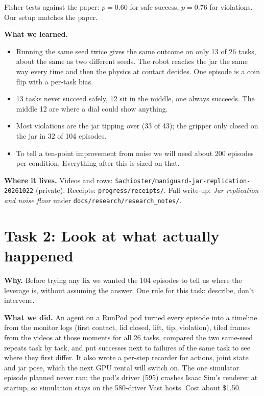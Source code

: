 \documentclass[11pt,a4paper]{article}
\begin{document}
Fisher tests against the paper: $p = 0.60$ for safe success, $p = 0.76$ for violations. Our setup matches the paper.

\textbf{What we learned.}
\begin{itemize}\setlength\itemsep{1pt}
  \item Running the same seed twice gives the same outcome on only 13 of 26 tasks, about the same as two different seeds. The robot reaches the jar the same way every time and then the physics at contact decides. One episode is a coin flip with a per-task bias.
  \item 13 tasks never succeed safely, 12 sit in the middle, one always succeeds. The middle 12 are where a dial could show anything.
  \item Most violations are the jar tipping over (33 of 43); the gripper only closed on the jar in 32 of 104 episodes.
  \item To tell a ten-point improvement from noise we will need about 200 episodes per condition. Everything after this is sized on that.
\end{itemize}

\textbf{Where it lives.} Videos and rows: \texttt{Sachioster/maniguard-jar-replication-20261022} (private). Receipts: \texttt{progress/receipts/}. Full write-up: \emph{Jar replication and noise floor} under \texttt{docs/research/research\_notes/}.
\newpage
\section*{Task 2: Look at what actually happened}

\textbf{Why.} Before trying any fix we wanted the 104 episodes to tell us where the leverage is, without assuming the answer. One rule for this task: describe, don't intervene.

\textbf{What we did.} An agent on a RunPod pod turned every episode into a timeline from the monitor logs (first contact, lid closed, lift, tip, violation), tiled frames from the videos at those moments for all 26 tasks, compared the two same-seed repeats task by task, and put successes next to failures of the same task to see where they first differ. It also wrote a per-step recorder for actions, joint state and jar pose, which the next GPU rental will switch on. The one simulator episode planned never ran: the pod's driver (595) crashes Isaac Sim's renderer at startup, so simulation stays on the 580-driver Vast hosts. Cost about \$1.50.
\end{document}
